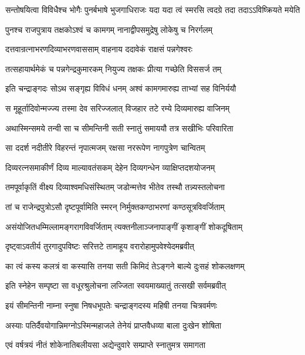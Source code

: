 \fourlineindentedshloka
{सन्तोषयित्वा विविधैश्च भोगैः}
{पुनर्बभाषे भुजगाधिराजः}
{यदा यदा त्वं स्मरसि त्वदग्रे}
{तदा तदाऽऽविष्क्रियते मयेति} %

\twolineshloka
{पुनश्च राजपुत्राय तक्षकोऽश्वं च कामगम्}
{नानाद्वीपसमुद्रेषु लोकेषु च निरर्गलम्} %

\twolineshloka
{दत्तवान्रत्नाभरणदिव्याभरणवाससाम्}
{वाहनाय ददावेकं राक्षसं पन्नगेश्वरः} %

\twolineshloka
{तत्सहायार्थमेकं च पन्नगेन्द्रकुमारकम्}
{नियुज्य तक्षकः प्रीत्या गच्छेति विससर्ज तम्} %

\twolineshloka
{इति चन्द्राङ्गदः सोऽथ सङ्गृह्य विविधं धनम्}
{अश्वं कामगमारुह्य ताभ्यां सह विनिर्ययौ} %

\twolineshloka
{स मूहूर्तादिवोन्मज्ज्य तस्मा देव सरिज्जलात्}
{विजहार तटे रम्ये दिव्यमारुह्य वाजिनम्} %

\twolineshloka
{अथास्मिन्समये तन्वी सा च सीमन्तिनी सती}
{स्नातुं समाययौ तत्र सखीभिः परिवारिता} %

\twolineshloka
{सा ददर्श नदीतीरे विहरन्तं नृपात्मजम्}
{रक्षसा नररूपेण नागपुत्रेण चान्वितम्} %

\twolineshloka
{दिव्यरत्नसमाकीर्णं दिव्य माल्यावतंसकम्}
{देहेन दिव्यगन्धेन व्याक्षिप्तदशयोजनम्} %

\twolineshloka
{तमपूर्वाकृतिं वीक्ष्य दिव्याश्वमधिसंस्थितम्}
{जडोन्मत्तेव भीतेव तस्थौ तन्न्यस्तलोचना} %

\twolineshloka
{तां च राजेन्द्रपुत्रोऽसौ दृष्टपूर्वामिति स्मरन्}
{निर्मुक्तकण्ठाभरणां कण्ठसूत्रविवर्जिताम्} %

\twolineshloka
{असंयोजितधम्मिल्लामङ्गरागविवर्जिताम्}
{त्यक्तनीलाञ्जनापाङ्गीं कृशाङ्गीं शोकदूषिताम्} %

\twolineshloka
{दृष्ट्वाऽवतीर्य तुरगादुपविष्टः सरित्तटे}
{तामाहूय वरारोहामुपवेश्येदमब्रवीत्} %

\twolineshloka
{का त्वं कस्य कलत्रं वा कस्यासि तनया सती}
{किमिदं तेऽङ्गने बाल्ये दुःसहं शोकलक्षणम्} %

\twolineshloka
{इति स्नेहेन सम्पृष्टा सा वधूरश्रुलोचना}
{लज्जिता स्वयमाख्यातुं तत्सखी सर्वमब्रवीत्} %

\twolineshloka
{इयं सीमन्तिनी नाम्ना स्नुषा निषधभूपतेः}
{चन्द्राङ्गदस्य महिषी तनया चित्रवर्मणः} %

\twolineshloka
{अस्याः पतिर्दैवयोगान्निमग्नोऽस्मिन्महाजले}
{तेनेयं प्राप्तवैधव्या बाला दुःखेन शोषिता} %

\twolineshloka
{एवं वर्षत्रयं नीतं शोकेनातिबलीयसा}
{अद्येन्दुवारे सम्प्राप्ते स्नातुमत्र समागता} %

